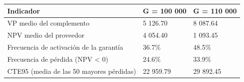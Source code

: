\begin{tabular}{lll}
\toprule
Indicador & G = 100 000 & G = 110 000 \\
\midrule
VP medio del complemento & 5 126.70 & 8 087.64 \\
NPV medio del proveedor & 4 054.40 & 1 093.45 \\
Frecuencia de activación de la garantía & 36.7\% & 48.5\% \\
Frecuencia de pérdida (NPV < 0) & 24.6\% & 33.9\% \\
CTE95 (media de las 50 mayores pérdidas) & 22 959.79 & 29 892.45 \\
\bottomrule
\end{tabular}
